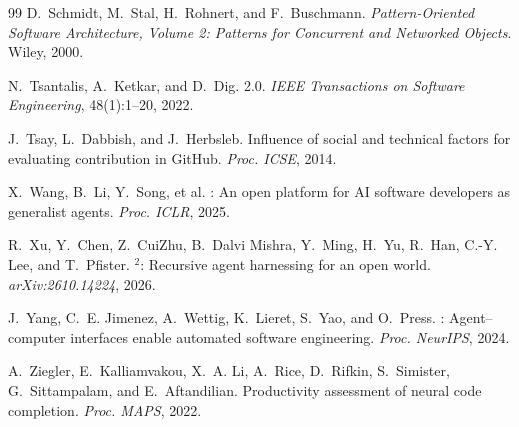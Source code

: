 \documentclass[sigconf,review]{acmart}
\begin{document}
\begin{thebibliography}{99}
D.~Schmidt, M.~Stal, H.~Rohnert, and F.~Buschmann.
\newblock \emph{Pattern-Oriented Software Architecture, Volume 2: Patterns for Concurrent and Networked Objects}.
\newblock Wiley, 2000.

N.~Tsantalis, A.~Ketkar, and D.~Dig.
 2.0.
\newblock \emph{IEEE Transactions on Software Engineering}, 48(1):1--20, 2022.

J.~Tsay, L.~Dabbish, and J.~Herbsleb.
\newblock Influence of social and technical factors for evaluating contribution in {GitHub}.
\newblock \emph{Proc. ICSE}, 2014.

X.~Wang, B.~Li, Y.~Song, et al.
: An open platform for {AI} software developers as generalist agents.
\newblock \emph{Proc. ICLR}, 2025.

R.~Xu, Y.~Chen, Z.~CuiZhu, B.~Dalvi Mishra, Y.~Ming, H.~Yu, R.~Han, C.-Y. Lee, and T.~Pfister.
$^2$: Recursive agent harnessing for an open world.
\newblock \emph{arXiv:2610.14224}, 2026.

J.~Yang, C.~E. Jimenez, A.~Wettig, K.~Lieret, S.~Yao, and O.~Press.
: Agent--computer interfaces enable automated software engineering.
\newblock \emph{Proc. NeurIPS}, 2024.

A.~Ziegler, E.~Kalliamvakou, X.~A. Li, A.~Rice, D.~Rifkin, S.~Simister, G.~Sittampalam, and E.~Aftandilian.
\newblock Productivity assessment of neural code completion.
\newblock \emph{Proc. MAPS}, 2022.

\end{thebibliography}
\end{document}
